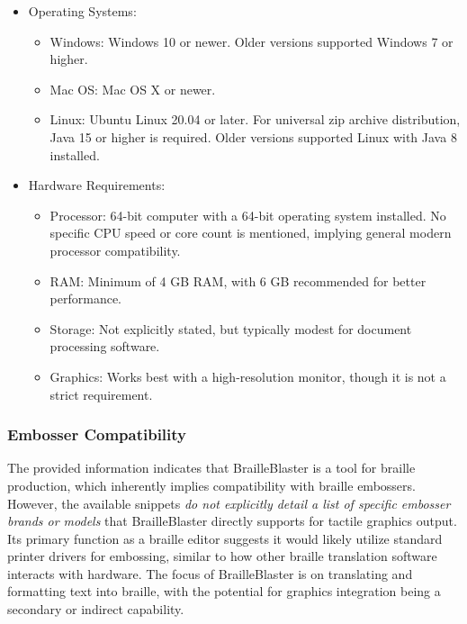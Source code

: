\begin{itemize}
    \item Operating Systems:
    \begin{itemize}
        \item Windows: Windows 10 or newer.\cite{SterlingAdaptivesVP} Older versions supported Windows 7 or higher.\cite{SterlingAdaptivesVP}
        \item Mac OS: Mac OS X or newer.\cite{SterlingAdaptivesVP}
        \item Linux: Ubuntu Linux 20.04 or later. For universal zip archive distribution, Java 15 or higher is required.\cite{SterlingAdaptivesVP} Older versions supported Linux with Java 8 installed.\cite{SterlingAdaptivesVP}
    \end{itemize}
    \item Hardware Requirements:
    \begin{itemize}
        \item Processor: 64-bit computer with a 64-bit operating system installed.\cite{SterlingAdaptivesVP} No specific CPU speed or core count is mentioned, implying general modern processor compatibility.
        \item RAM: Minimum of 4 GB RAM, with 6 GB recommended for better performance.\cite{SterlingAdaptivesVP}
        \item Storage: Not explicitly stated, but typically modest for document processing software.
        \item Graphics: Works best with a high-resolution monitor, though it is not a strict requirement.\cite{SterlingAdaptivesVP}
    \end{itemize}
\end{itemize}

\subsubsection{Embosser Compatibility}

The provided information indicates that BrailleBlaster is a tool for braille production, which inherently implies compatibility with braille embossers. However, the available snippets \emph{do not explicitly detail a list of specific embosser brands or models} that BrailleBlaster directly supports for tactile graphics output. Its primary function as a braille editor suggests it would likely utilize standard printer drivers for embossing, similar to how other braille translation software interacts with hardware. The focus of BrailleBlaster is on translating and formatting text into braille, with the potential for graphics integration being a secondary or indirect capability.

